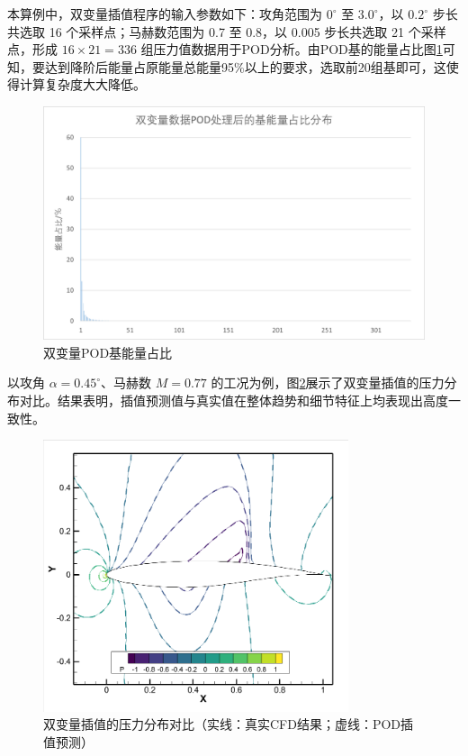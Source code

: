 本算例中，双变量插值程序的输入参数如下：攻角范围为 \(0^\circ\) 至 \(3.0^\circ\)，以 \(0.2^\circ\) 步长共选取 16 个采样点；马赫数范围为 0.7 至 0.8，以 0.005 步长共选取 21 个采样点，形成 \(16 \times 21 = 336\) 组压力值数据用于POD分析。由POD基的能量占比图\ref{fig_result2}可知，要达到降阶后能量占原能量总能量95\%以上的要求，选取前20组基即可，这使得计算复杂度大大降低。
\begin{figure}[H]
    \centering
    \includegraphics[width=1.0\linewidth]{双变量能量占比.png}
    \caption{\songti 双变量POD基能量占比\\}
    \label{fig_result2}
\end{figure}

以攻角 \( \alpha = 0.45^\circ \)、马赫数 \( M = 0.77 \) 的工况为例，图\ref{fig:double_interp}展示了双变量插值的压力分布对比。结果表明，插值预测值与真实值在整体趋势和细节特征上均表现出高度一致性。
\begin{figure}[H]
    \centering
    \includegraphics[width=0.8\textwidth]{0.45_0.77对比图.png}
    \caption{双变量插值的压力分布对比（实线：真实CFD结果；虚线：POD插值预测）}
    \label{fig:double_interp}
\end{figure}

